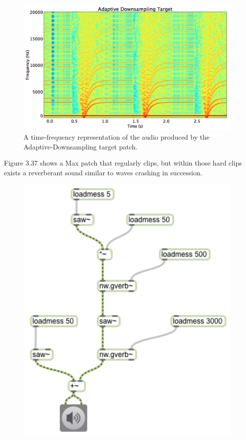 \documentclass[a4paper,12pt]{report} 	%
\numberwithin{figure}{chapter}
\numberwithin{table}{chapter}
\numberwithin{equation}{chapter}
\begin{document}
\begin{flushleft}
\begin{figure}[h!]
\begin{center}
\includegraphics[width=\linewidth]{AdaptiveDownsamplingTargetSTFT}
\caption[Adaptive Downsampling Time-Frequency Representation]{A time-frequency representation of the audio produced by the Adaptive-Downsampling target patch.}
\end{center}
\end{figure}
Figure 3.37 shows a Max patch that regularly clips, but within those hard clips exists a reverberant sound similar to waves crashing in succession. 
\begin{figure}[h!]
\begin{center}
\includegraphics[scale=0.8]{ClippingReverbSaw}

\end{center}
\end{figure}
\end{flushleft}
\end{document}
